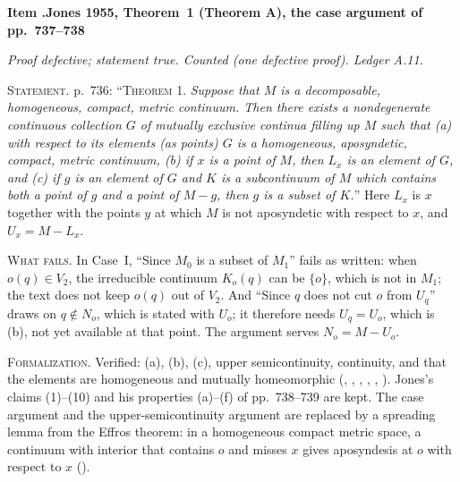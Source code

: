 \documentclass[11pt]{article}
\newcounter{defect}
\newenvironment{defect}[4]{%
  \par\addvspace{10pt}\refstepcounter{defect}%
  \noindent\textbf{Item \thedefect.\enspace #1}\par\nopagebreak
  \noindent\textit{#2}\par\nopagebreak\smallskip}{\par\addvspace{6pt}}
\newcommand{\fld}[1]{\par\noindent\textsc{#1.}\enspace}
\begin{document}
\begin{defect}{Jones 1955, Theorem~1 (Theorem A), the case argument of pp.~737--738}{Proof
defective; statement true. Counted (one defective proof). Ledger A.11.}{0}{1}\label{it:j55}

\fld{Statement} p.~736: ``\textsc{Theorem 1.} \emph{Suppose that $M$ is a decomposable,
homogeneous, compact, metric continuum. Then there exists a nondegenerate continuous collection
$G$ of mutually exclusive continua filling up $M$ such that (a) with respect to its elements (as
points) $G$ is a homogeneous, aposyndetic, compact, metric continuum, (b) if $x$ is a point of $M$,
then $L_x$ is an element of $G$, and (c) if $g$ is an element of $G$ and $K$ is a subcontinuum of
$M$ which contains both a point of $g$ and a point of $M-g$, then $g$ is a subset of $K$.}'' Here
$L_x$ is $x$ together with the points $y$ at which $M$ is not aposyndetic with respect to $x$, and
$U_x=M-L_x$.

\fld{What fails} In Case~I, ``Since $M_0$ is a subset of $M_1$'' fails as written: when $o(q)\in
V_2$, the irreducible continuum $K_o(q)$ can be $\{o\}$, which is not in $M_1$; the text does not
keep $o(q)$ out of $V_2$. And ``Since $q$ does not cut $o$ from $U_q$'' draws on $q\notin N_o$,
which is stated with $U_o$; it therefore needs $U_q=U_o$, which is (b), not yet available at that
point. The argument serves $N_o=M-U_o$.

\fld{Formalization} Verified: (a), (b), (c), upper semicontinuity, continuity, and that the
elements are homogeneous and mutually homeomorphic (, ,
, , , ). Jones's
claims (1)--(10) and his properties (a)--(f) of pp.~738--739 are kept. The case argument and the
upper-semicontinuity argument are replaced by a spreading lemma from the Effros theorem: in a
homogeneous compact metric space, a continuum with interior that contains $o$ and misses $x$ gives
aposyndesis at $o$ with respect to $x$ ().
\end{defect}
\end{document}
